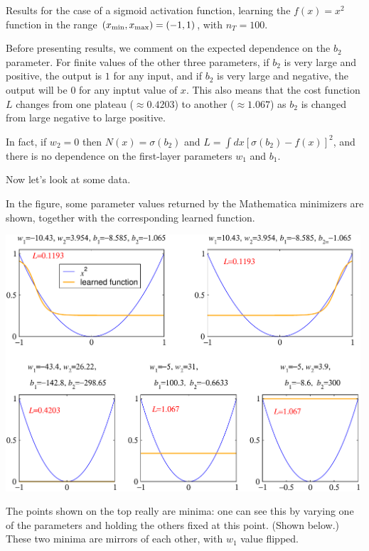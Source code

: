 \documentclass[12pt,a4paper]{article}
\begin{document}
Results for the case of a sigmoid activation function, learning the $f(x)=x^2$ function in the range
$(x_{\rm min},x_{\rm max}) = (-1,1)$, with $n_T=100$.  

Before presenting results, we comment on the expected dependence on the $b_2$ parameter.  For finite
values of the other three parameters, if $b_2$ is very large and positive, the output is $1$ for any input, and
if $b_2$ is very large and negative, the output will be $0$ for any inptut value of $x$.  This also
means that the cost function $L$ changes from one plateau ($\approx0.4203$) to another
($\approx1.067$) as $b_2$ is changed from large negative to large positive.  

In fact, if $w_2=0$ then $N(x)=\sigma(b_2)$ and $L=\int{}dx[\sigma(b_2)-f(x)]^2$, and there is no
dependence on the first-layer parameters $w_1$ and $b_1$.  

Now let's look at some data.  

In the figure, some parameter values returned by the Mathematica minimizers are shown, together with
the corresponding learned function.



\smallskip

\begin{center}
\includegraphics[width=0.99\textwidth]{Images/3node_largedomain_learnedfunctions_a_01}
\end{center}

The points shown on the top really are minima: one can see this by varying one of the parameters and
holding the others fixed at this point.  (Shown below.)  These two minima are mirrors of each other,
with $w_1$ value flipped.
\end{document}
